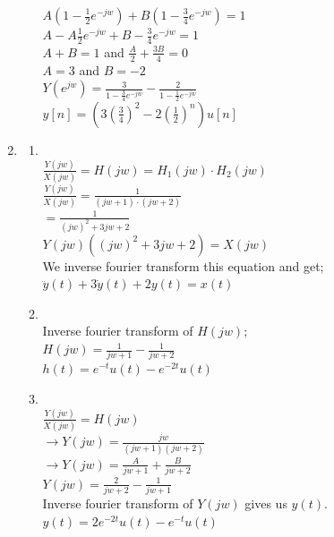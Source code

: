 \documentclass[10pt,a4paper, margin=1in]{article}
\begin{document}
\begin{enumerate}
\begin{enumerate}
              $A (1-\frac{1}{2}e^{-jw}) + B(1-\frac{3}{4}e^{-jw}) = 1$\\

              $A - A\frac{1}{2}e^{-jw} + B - \frac{3}{4}e^{-jw} = 1$\\

              $A+B = 1 $ and $\frac{A}{2} + \frac{3B}{4} = 0$ \\

              $A = 3$ and $B = -2$\\

              $Y(e^{jw}) = \frac{3}{1 - \frac{3}{4}e^{-jw}} - \frac{2}{1 - \frac{1}{2}e^{-jw}}$ \\

              $y[n] = (3(\frac{3}{4})^2 - 2(\frac{1}{2})^n)u[n]$


          \end{enumerate}

    \item %
          \begin{enumerate}
              \item~\\
              $\frac{Y(jw)}{X(jw)}=H(jw)=H_1(jw)\cdot H_2(jw)$\\
              $\frac{Y(jw)}{X(jw)} = \frac{1}{(jw+1)\cdot(jw+2)}$\\
              $=\frac{1}{(jw)^2+3jw+2}$\\
              $Y(jw)((jw)^2+3jw+2) = X(jw)$\\
              We inverse fourier transform this equation and get;\\
              $\ddot{y}(t)+3\dot{y}(t)+2y(t) = x(t)$\\
              \item~\\Inverse fourier transform of $H(jw)$;\\
              $H(jw) = \frac{1}{jw+1} - \frac{1}{jw+2}$\\
              $h(t) = e^{-t}u(t) -e^{-2t}u(t)$\\
              \item~\\ $\frac{Y(jw)}{X(jw)} = H(jw)$\\
              $\rightarrow Y(jw) = \frac{jw}{(jw+1)(jw+2)}$\\
              $\rightarrow Y(jw) = \frac{A}{jw+1} + \frac{B}{jw+2}$\\
              $Y(jw) = \frac{2}{jw+2} - \frac{1}{jw+1}$\\
              Inverse fourier transform of $Y(jw)$ gives us $y(t)$.\\
              $y(t) = 2e^{-2t}u(t)-e^{-t}u(t)$\\
          \end{enumerate}


\end{enumerate}
\end{document}
